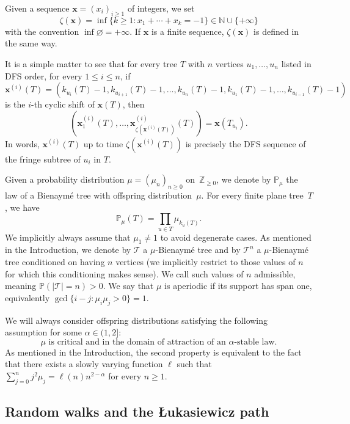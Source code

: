 \documentclass[a4paper,11pt]{article}
\DeclareRobustCommand{\P}{\mathbb{P}}
\DeclareRobustCommand{\1}{\mathbf{1}}
\newcommand{\T}{\mathcal{T}}
\newcommand{\N}{\mathbb{N}}
\begin{document}
Given a sequence $\mathbf{x}=(x_{i})_{i \geq 1}$ of integers, we set
$$ \zeta(\mathbf{x})= \inf \{k \geq 1 : x_{1}+\cdots+x_{k}=-1\} \in \N \cup \{+\infty\}$$
with the convention $\inf \varnothing=+\infty$.
If $\mathbf{x}$ is a finite sequence, $\zeta(\mathbf{x})$ is defined in the same way. 



It is a simple matter to see that for every tree $T$ with $n$ vertices  $u_{1}, \ldots, u_{n}$ listed in DFS order, for every $1 \leq i \leq n$, if $ \mathbf{x}^{(i)}(T)=(k_{u_{i}}(T)-1, k_{u_{i+1}}(T)-1, \ldots,k_{u_{n}}(T)-1,k_{u_{1}}(T)-1, \ldots,k_{u_{i-1}}(T)-1)$ is the $i$-th cyclic shift of $\mathbf{x}(T)$, then 
\begin{equation}
\label{eq:fringe}
\left(\mathbf{x}^{(i)}_{1}(T), \ldots,\mathbf{x}^{(i)}_{\zeta(\mathbf{x}^{(i)}(T))}(T)\right)=\mathbf{x}(T_{u_{i}}).
\end{equation}
In words, $\mathbf{x}^{(i)}(T)$ up to time $\zeta(\mathbf{x}^{(i)}(T))$  is precisely the DFS sequence of the fringe subtree of $u_{i}$ in $T$.


Given a probability distribution $\mu = (\mu_n)_{n \geq 0}$ on~$\mathbb{Z}_{\geq 0}$, we denote by $\P_{\mu}$ the law of a Bienaym\'e tree with offspring distribution~$\mu$. For every finite plane tree~$T$, we have
\[
\P_\mu(T) = \prod_{u \in T} \mu_{k_u(T)}.
\]
We implicitly always assume that $\mu_1 \neq 1$ to avoid degenerate cases. As mentioned in the Introduction, we denote by $ \mathcal{T}$ a $\mu$-Bienaymé tree and by $ \T^{n}$ a $\mu$-Bienaymé tree conditioned on having $n$ vertices (we implicitly restrict to those values of $n$ for which this conditioning makes sense). We call such values of $n$ admissible, meaning $\P(|\mathcal T|=n)>0$. We say that $\mu$ is aperiodic if its support has span one, equivalently $\gcd\{i-j:\mu_i\mu_j>0\}=1$.
 
 We will always consider offspring distributions satisfying the following assumption for some $\alpha \in (1,2]$:
\begin{equation*}
  \mu \textrm{ is critical and in the domain of attraction of an }
  \alpha\textrm{-stable law}.
  \tag{$H_\alpha$}
  \label{eq:Halpha}
\end{equation*}
As mentioned in the Introduction, the second property is equivalent to the fact that there exists a slowly varying function $\ell$ such that $ \sum_{j=0}^{n} j^{2} \mu_j =\ell(n) n ^{2-\alpha}$ for every $n \geq 1$.


\subsection{Random walks and the \L ukasiewicz path}\label{sec:rw}
\label{ssec:RW}
\end{document}

